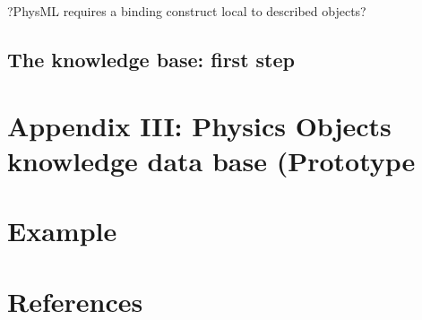 \documentclass[12pt]{article}
\begin{document}
?PhysML requires a binding construct local to described objects?


\subsection{The knowledge base: first step}
\section{Appendix III: Physics Objects knowledge data base (Prototype}
\section{Example}
\section{References}
\begin{small}
\end{small}
\end{document}
